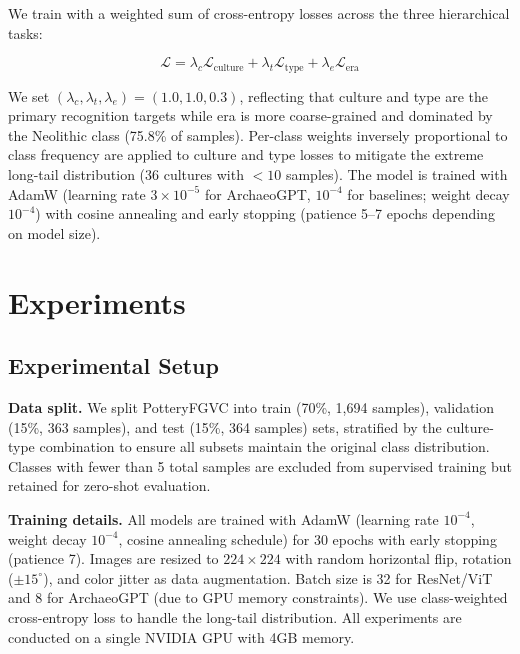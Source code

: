 \documentclass[10pt,twocolumn,letterpaper]{article}
\begin{document}
We train with a weighted sum of cross-entropy losses across the three hierarchical tasks:

\begin{equation}
\mathcal{L} = \lambda_c \mathcal{L}_{\text{culture}} + \lambda_t \mathcal{L}_{\text{type}} + \lambda_e \mathcal{L}_{\text{era}}
\label{eq:loss}
\end{equation}

We set $(\lambda_c, \lambda_t, \lambda_e) = (1.0, 1.0, 0.3)$, reflecting that culture and type are the primary recognition targets while era is more coarse-grained and dominated by the Neolithic class (75.8\% of samples). Per-class weights inversely proportional to class frequency are applied to culture and type losses to mitigate the extreme long-tail distribution (36 cultures with $<10$ samples). The model is trained with AdamW (learning rate $3{\times}10^{-5}$ for ArchaeoGPT, $10^{-4}$ for baselines; weight decay $10^{-4}$) with cosine annealing and early stopping (patience 5--7 epochs depending on model size).

\section{Experiments}
\label{sec:experiments}

\subsection{Experimental Setup}

\textbf{Data split.} We split PotteryFGVC into train (70\%, 1,694 samples), validation (15\%, 363 samples), and test (15\%, 364 samples) sets, stratified by the culture-type combination to ensure all subsets maintain the original class distribution. Classes with fewer than 5 total samples are excluded from supervised training but retained for zero-shot evaluation.

\textbf{Training details.} All models are trained with AdamW (learning rate $10^{-4}$, weight decay $10^{-4}$, cosine annealing schedule) for 30 epochs with early stopping (patience 7). Images are resized to $224 \times 224$ with random horizontal flip, rotation ($\pm 15^\circ$), and color jitter as data augmentation. Batch size is 32 for ResNet/ViT and 8 for ArchaeoGPT (due to GPU memory constraints). We use class-weighted cross-entropy loss to handle the long-tail distribution. All experiments are conducted on a single NVIDIA GPU with 4GB memory.
\end{document}
